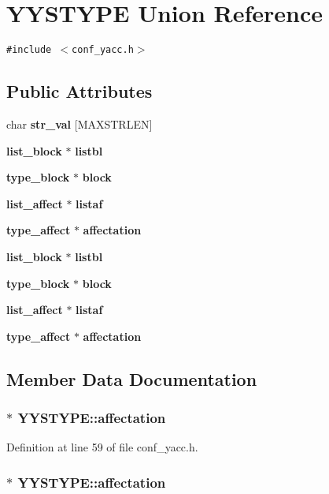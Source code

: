 \section{YYSTYPE Union Reference}
\label{unionYYSTYPE}
{\tt \#include $<$conf\_\-yacc.h$>$}

\subsection*{Public Attributes}
\begin{CompactItemize}
\item 
char {\bf str\_\-val} [MAXSTRLEN]
\item 
{\bf list\_\-block} $\ast$ {\bf listbl}
\item 
{\bf type\_\-block} $\ast$ {\bf block}
\item 
{\bf list\_\-affect} $\ast$ {\bf listaf}
\item 
{\bf type\_\-affect} $\ast$ {\bf affectation}
\item 
{\bf list\_\-block} $\ast$ {\bf listbl}
\item 
{\bf type\_\-block} $\ast$ {\bf block}
\item 
{\bf list\_\-affect} $\ast$ {\bf listaf}
\item 
{\bf type\_\-affect} $\ast$ {\bf affectation}
\end{CompactItemize}


\subsection{Member Data Documentation}
\subsubsection{$\ast$ {\bf YYSTYPE::affectation}}\label{unionYYSTYPE_o8}




Definition at line 59 of file conf\_\-yacc.h.
\subsubsection{$\ast$ {\bf YYSTYPE::affectation}}\label{unionYYSTYPE_o4}




